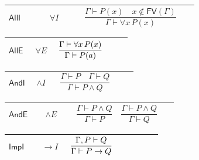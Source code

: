 \documentclass[12pt,reqno]{amsart}
\theoremstyle{blueplain}
\numberwithin{equation}{section}
\begin{document}
{\scriptsize \setlength{\parskip}{0pt}\nointerlineskip
\noindent 
\begin{tabular}{|@{}>{\centering\arraybackslash}m{0.19251\linewidth}|>{\centering\arraybackslash}m{0.16845\linewidth}|>{\centering\arraybackslash}m{0.53904\linewidth}|}
\hline
\hypertarget{rule:AllI}{$\displaystyle \mathsf{AllI}$} & $\displaystyle %
\forall I$ & \rule[-3.3ex]{0pt}{7.8ex}$\displaystyle \dfrac{\Gamma\vdash
P(x)\quad x\notin\mathsf{FV}(\Gamma)}{\Gamma\vdash\forall x\,P(x)}$ \\ \hline
\end{tabular}%
}

{\scriptsize \setlength{\parskip}{0pt}\nointerlineskip
\noindent 
\begin{tabular}{|@{}>{\centering\arraybackslash}m{0.19251\linewidth}|>{\centering\arraybackslash}m{0.16845\linewidth}|>{\centering\arraybackslash}m{0.53904\linewidth}|}
\hline
\hypertarget{rule:AllE}{$\displaystyle \mathsf{AllE}$} & $\displaystyle %
\forall E$ & \rule[-3.3ex]{0pt}{7.8ex}$\displaystyle \dfrac{%
\Gamma\vdash\forall x\,P(x)}{\Gamma\vdash P(a)}$ \\ \hline
\end{tabular}%
}

{\scriptsize \setlength{\parskip}{0pt}\nointerlineskip
\noindent 
\begin{tabular}{|@{}>{\centering\arraybackslash}m{0.19251\linewidth}|>{\centering\arraybackslash}m{0.16845\linewidth}|>{\centering\arraybackslash}m{0.53904\linewidth}|}
\hline
\hypertarget{rule:AndI}{$\displaystyle \mathsf{AndI}$} & $\displaystyle %
\wedge I$ & \rule[-3.3ex]{0pt}{7.8ex}$\displaystyle \dfrac{\Gamma\vdash
P\quad\Gamma\vdash Q}{\Gamma\vdash P\land Q}$ \\ \hline
\end{tabular}%
}

{\scriptsize \setlength{\parskip}{0pt}\nointerlineskip
\noindent 
\begin{tabular}{|@{}>{\centering\arraybackslash}m{0.19251\linewidth}|>{\centering\arraybackslash}m{0.16845\linewidth}|>{\centering\arraybackslash}m{0.53904\linewidth}|}
\hline
\hypertarget{rule:AndE}{$\displaystyle \mathsf{AndE}$} & $\displaystyle %
\wedge E$ & \rule[-3.3ex]{0pt}{7.8ex}$\displaystyle \dfrac{\Gamma\vdash
P\land Q}{\Gamma\vdash P}\quad\dfrac{\Gamma\vdash P\land Q}{\Gamma\vdash Q}$
\\ \hline
\end{tabular}%
}

{\scriptsize \setlength{\parskip}{0pt}\nointerlineskip
\noindent 
\begin{tabular}{|@{}>{\centering\arraybackslash}m{0.19251\linewidth}|>{\centering\arraybackslash}m{0.16845\linewidth}|>{\centering\arraybackslash}m{0.53904\linewidth}|}
\hline
\hypertarget{rule:ImpI}{$\displaystyle \mathsf{ImpI}$} & $\displaystyle \to I
$ & \rule[-3.3ex]{0pt}{7.8ex}$\displaystyle \dfrac{\Gamma,P\vdash Q}{%
\Gamma\vdash P\to Q}$ \\ \hline
\end{tabular}%
}
\end{document}
